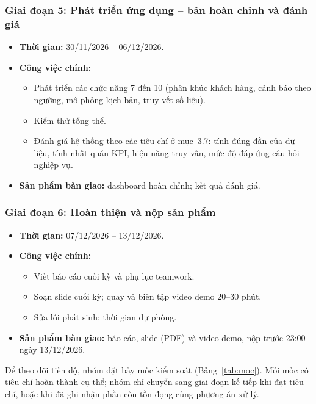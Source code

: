 \subsubsection*{Giai đoạn 5: Phát triển ứng dụng -- bản hoàn chỉnh và đánh giá}
\begin{itemize}
    \item \textbf{Thời gian:} 30/11/2026 -- 06/12/2026.
    \item \textbf{Công việc chính:}
    \begin{itemize}
        \item Phát triển các chức năng 7 đến 10 (phân khúc khách hàng, cảnh báo theo
              ngưỡng, mô phỏng kịch bản, truy vết số liệu).
        \item Kiểm thử tổng thể.
        \item Đánh giá hệ thống theo các tiêu chí ở mục~3.7: tính đúng đắn của dữ liệu,
              tính nhất quán KPI, hiệu năng truy vấn, mức độ đáp ứng câu hỏi nghiệp vụ.
    \end{itemize}
    \item \textbf{Sản phẩm bàn giao:} dashboard hoàn chỉnh; kết quả đánh giá.
\end{itemize}

\subsubsection*{Giai đoạn 6: Hoàn thiện và nộp sản phẩm}
\begin{itemize}
    \item \textbf{Thời gian:} 07/12/2026 -- 13/12/2026.
    \item \textbf{Công việc chính:}
    \begin{itemize}
        \item Viết báo cáo cuối kỳ và phụ lục teamwork.
        \item Soạn slide cuối kỳ; quay và biên tập video demo 20--30 phút.
        \item Sửa lỗi phát sinh; thời gian dự phòng.
    \end{itemize}
    \item \textbf{Sản phẩm bàn giao:} báo cáo, slide (PDF) và video demo, nộp trước
          23:00 ngày 13/12/2026.
\end{itemize}

\medskip
\noindent Để theo dõi tiến độ, nhóm đặt bảy mốc kiểm soát (Bảng~\ref{tab:moc}). Mỗi mốc có tiêu
chí hoàn thành cụ thể; nhóm chỉ chuyển sang giai đoạn kế tiếp khi đạt tiêu chí, hoặc
khi đã ghi nhận phần còn tồn đọng cùng phương án xử lý.

